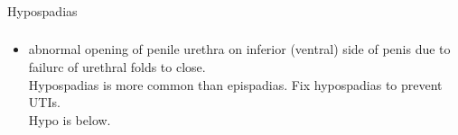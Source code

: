 \documentclass[11pt]{beamer}
\begin{document}
\begin{frame}
 \frametitle{}
Hypospadias
\end{frame}

\begin{frame}
 \frametitle{}
\begin{itemize}
\item{abnormal opening of penile urethra on inferior (ventral) side of penis due to failurc of urethral folds to close. \\ Hypospadias is more common than epispadias. Fix hypospadias to prevent UTIs. \\ Hypo is below.}
\end{itemize}
\end{frame}
\end{document}
